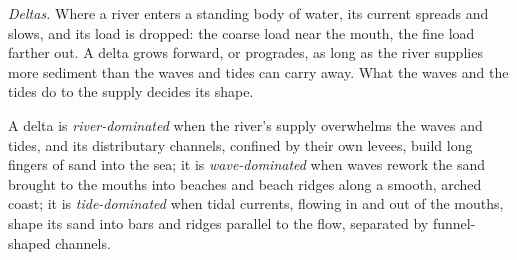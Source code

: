\emph{Deltas.} Where a river enters a standing body of water, its current
spreads and slows, and its load is dropped: the coarse load near the mouth, the
fine load farther out. A delta grows forward, or progrades, as long as the
river supplies more sediment than the waves and tides can carry away. What the
waves and the tides do to the supply decides its shape.

\begin{definition}\label{def:b1:clastic-sediments:delta}
A delta is \emph{river-dominated} when the river's
supply overwhelms the waves and tides, and its distributary channels, confined by
their own levees, build long fingers of sand into the sea; it is
\emph{wave-dominated} when waves rework the sand
brought to the mouths into beaches and beach ridges along a smooth, arched
coast; it is \emph{tide-dominated} when tidal
currents, flowing in and out of the mouths, shape its sand into bars and ridges
parallel to the flow, separated by funnel-shaped channels.
\end{definition}

